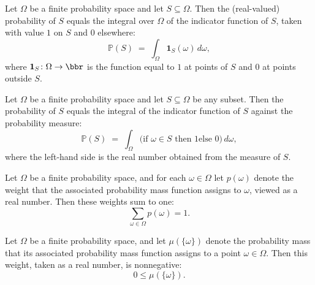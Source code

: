 \begin{theorem}
\label{CommunicationComplexity.FiniteProbabilitySpace.measureReal_eq_integral_indicator_one}
\leanok
{}
Let $\Omega$ be a finite probability space and let $S \subseteq \Omega$. Then the
(real-valued) probability of $S$ equals the integral over $\Omega$ of the indicator
function of $S$, taken with value $1$ on $S$ and $0$ elsewhere:
\[
\mathbb{P}(S) \;=\; \int_{\Omega} \mathbf{1}_S(\omega)\, d\omega,
\]
where $\mathbf{1}_S \colon \Omega \to \bbr$ is the function equal to $1$ at points of
$S$ and $0$ at points outside $S$.
\end{theorem}

\begin{theorem}
\label{CommunicationComplexity.FiniteProbabilitySpace.measureReal_eq_integral_indicator}
\leanok
{}
Let $\Omega$ be a finite probability space and let $S \subseteq \Omega$ be any subset.
Then the probability of $S$ equals the integral of the indicator function of $S$ against
the probability measure:
\[
\mathbb{P}(S) \;=\; \int_\Omega \bigl(\text{if } \omega \in S \text{ then } 1 \text{
else } 0\bigr)\,d\omega,
\]
where the left-hand side is the real number obtained from the measure of $S$.
\end{theorem}

\begin{theorem}
\label{CommunicationComplexity.FiniteProbabilitySpace.pmf_toReal_sum_eq_one}
\leanok
{}
Let $\Omega$ be a finite probability space, and for each $\omega \in \Omega$ let
$p(\omega)$ denote the weight that the associated probability mass function assigns to
$\omega$, viewed as a real number. Then these weights sum to one: \[ \sum_{\omega \in
\Omega} p(\omega) = 1. \]
\end{theorem}

\begin{theorem}
\label{CommunicationComplexity.FiniteProbabilitySpace.pmf_toReal_nonneg}
\leanok
{}
Let $\Omega$ be a finite probability space, and let $\mu(\{\omega\})$ denote the
probability mass that its associated probability mass function assigns to a point
$\omega \in \Omega$. Then this weight, taken as a real number, is nonnegative: \[ 0 \le
\mu(\{\omega\}). \]
\end{theorem}

